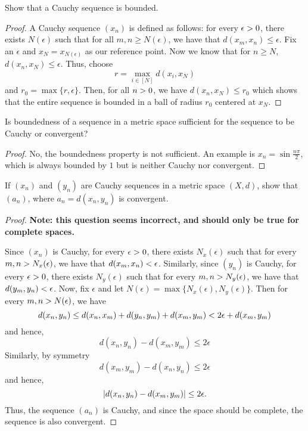 \begin{question}
    Show that a Cauchy sequence is bounded.
    \label{section1.4-4}
\end{question}
\begin{proof}
    A Cauchy sequence $(x_n)$ is defined as follows: for every $\epsilon > 0$, there exists $N(\epsilon)$ such that for all $m,n \geq N(\epsilon)$, we have that $d(x_m , x_n) \leq \epsilon.$ Fix an $\epsilon$ and $x_N = x_{N(\epsilon)}$ as our reference point. Now we know that for $n \geq N$, $d(x_n  , x_N) \leq \epsilon$. Thus, choose 
    \[r = \max_{i \in [N]} d(x_i,x_N)\]
    and $r_0 = \max\{r , \epsilon\}$. Then, for all $n > 0$, we have $d(x_n , x_N) \leq r_0$ which shows that the entire sequence is bounded in a ball of radius $r_0$ centered at $x_N$.
 \end{proof}

 \begin{question}
     Is boundedness of a sequence in a metric space sufficient for the sequence to be Cauchy or convergent?
     \label{section1.4-5}
 \end{question}
 \begin{proof}
     No, the boundedness property is not sufficient. An example is $x_n = \sin \frac{n\pi}{2}$, which is always bounded by $1$ but is neither Cauchy nor convergent.
 \end{proof}

 \begin{question}
     If $(x_n)$ and $(y_n)$ are Cauchy sequences in a metric space $(X,d)$, show that $(a_n)$, where $a_n  =d(x_n,y_n)$ is convergent.
     \label{section1.4-6}
 \end{question}
 \begin{proof}
     \textbf{Note: this question seems incorrect, and should only be true for complete spaces.}
     
     Since $(x_n)$ is Cauchy, for every $\epsilon > 0$, there exists $N_x(\epsilon)$ such that for every $m,n > N_x(\epsilon)$, we have that $d(x_m,x_n) < \epsilon$. Similarly,  since $(y_n)$ is Cauchy, for every $\epsilon > 0$, there exists $N_y(\epsilon)$ such that for every $m,n > N_y(\epsilon)$, we have that $d(y_m,y_n) < \epsilon$. Now, fix $\epsilon$ and let $N(\epsilon) = \max\{N_x(\epsilon) , N_y(\epsilon)\}$. Then for every $m , n > N(\epsilon)$, we have
     \[d(x_n,y_n) \leq  d(x_n,x_m) + d(y_n,y_m) + d(x_m,y_m) < 2\epsilon + d(x_m,y_m)\]
     and hence, 
     \[d(x_n,y_n) - d(x_m,y_m) \leq 2\epsilon\]
     Similarly, by symmetry
    \[d(x_m,y_m) - d(x_n,y_n) \leq 2\epsilon\]
    and hence,
    \[\left\lvert d(x_n,y_n) - d(x_m,y_m) \right\rvert \leq 2\epsilon.\]
    Thus, the sequence $(a_n)$ is Cauchy, and since the space should be complete, the sequence is also convergent.
 \end{proof}

